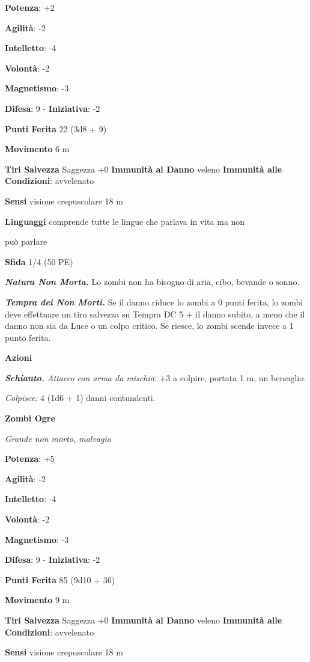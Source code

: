 \begin{multicols}{2}
\textbf{Potenza}: +2

\textbf{Agilità}: -2

\textbf{Intelletto}: -4

\textbf{Volontà}: -2

\textbf{Magnetismo}: -3

\textbf{Difesa}: 9 - \textbf{Iniziativa}: -2

\textbf{Punti Ferita} 22 (3d8 + 9)

\textbf{Movimento} 6 m

\textbf{Tiri Salvezza} Saggezza +0 \textbf{Immunità al Danno} veleno
\textbf{Immunità alle Condizioni}: avvelenato

\textbf{Sensi} visione crepuscolare 18 m

\textbf{Linguaggi} comprende tutte le lingue che parlava in vita ma non

può parlare

\textbf{Sfida} 1/4 (50 PE)\smallskip

\emph{\textbf{Natura Non Morta.}} Lo zombi non ha bisogno di aria, cibo,
bevande o sonno.

\emph{\textbf{Tempra dei Non Morti.}} Se il danno riduce lo zombi a 0
punti ferita, lo zombi deve effettuare un tiro salvezza su Tempra
DC 5 + il danno subito, a meno che il danno non sia da Luce o un colpo
critico. Se riesce, lo zombi scende invece a 1 punto ferita.

\smallskip\textbf{Azioni}

\emph{\textbf{Schianto.} Attacco con arma da mischia}: +3 a colpire,
portata 1 m, un bersaglio.

\emph{Colpisce:} 4 (1d6 + 1) danni contundenti.

\textbf{Zombi Ogre}

\emph{Grande non morto, malvagio}

\textbf{Potenza}: +5

\textbf{Agilità}: -2

\textbf{Intelletto}: -4

\textbf{Volontà}: -2

\textbf{Magnetismo}: -3

\textbf{Difesa}: 9 - \textbf{Iniziativa}: -2

\textbf{Punti Ferita} 85 (9d10 + 36)

\textbf{Movimento} 9 m

\textbf{Tiri Salvezza} Saggezza +0 \textbf{Immunità al Danno} veleno
\textbf{Immunità alle Condizioni}: avvelenato

\textbf{Sensi} visione crepuscolare 18 m


\end{multicols}

